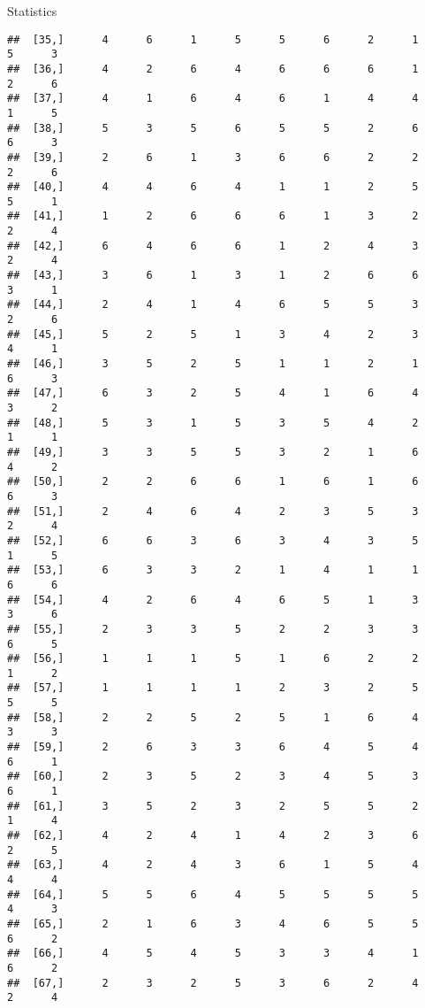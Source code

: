 \documentclass[
  ignorenonframetext,
]{beamer}
\begin{document}
\begin{frame}[fragile]{Statistics}
\begin{verbatim}
##  [35,]      4      6      1      5      5      6      2      1      5      3
##  [36,]      4      2      6      4      6      6      6      1      2      6
##  [37,]      4      1      6      4      6      1      4      4      1      5
##  [38,]      5      3      5      6      5      5      2      6      6      3
##  [39,]      2      6      1      3      6      6      2      2      2      6
##  [40,]      4      4      6      4      1      1      2      5      5      1
##  [41,]      1      2      6      6      6      1      3      2      2      4
##  [42,]      6      4      6      6      1      2      4      3      2      4
##  [43,]      3      6      1      3      1      2      6      6      3      1
##  [44,]      2      4      1      4      6      5      5      3      2      6
##  [45,]      5      2      5      1      3      4      2      3      4      1
##  [46,]      3      5      2      5      1      1      2      1      6      3
##  [47,]      6      3      2      5      4      1      6      4      3      2
##  [48,]      5      3      1      5      3      5      4      2      1      1
##  [49,]      3      3      5      5      3      2      1      6      4      2
##  [50,]      2      2      6      6      1      6      1      6      6      3
##  [51,]      2      4      6      4      2      3      5      3      2      4
##  [52,]      6      6      3      6      3      4      3      5      1      5
##  [53,]      6      3      3      2      1      4      1      1      6      6
##  [54,]      4      2      6      4      6      5      1      3      3      6
##  [55,]      2      3      3      5      2      2      3      3      6      5
##  [56,]      1      1      1      5      1      6      2      2      1      2
##  [57,]      1      1      1      1      2      3      2      5      5      5
##  [58,]      2      2      5      2      5      1      6      4      3      3
##  [59,]      2      6      3      3      6      4      5      4      6      1
##  [60,]      2      3      5      2      3      4      5      3      6      1
##  [61,]      3      5      2      3      2      5      5      2      1      4
##  [62,]      4      2      4      1      4      2      3      6      2      5
##  [63,]      4      2      4      3      6      1      5      4      4      4
##  [64,]      5      5      6      4      5      5      5      5      4      3
##  [65,]      2      1      6      3      4      6      5      5      6      2
##  [66,]      4      5      4      5      3      3      4      1      6      2
##  [67,]      2      3      2      5      3      6      2      4      2      4

\end{verbatim}
\end{frame}
\end{document}
